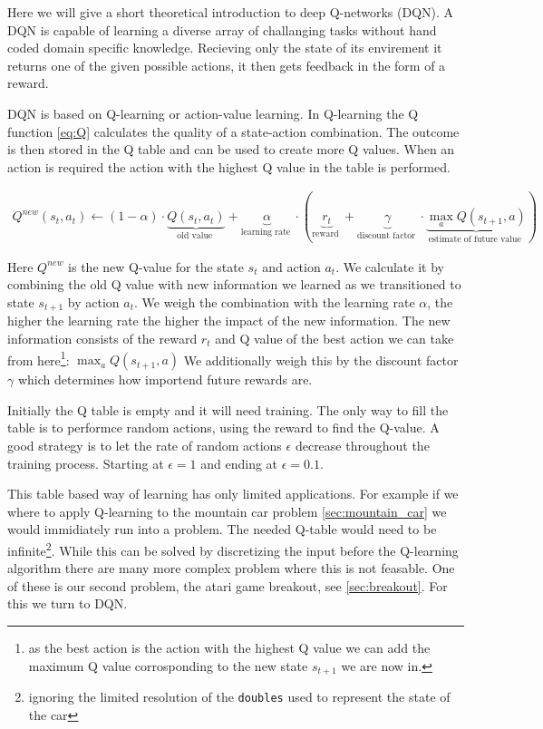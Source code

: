 \label{sec:theory}
Here we will give a short theoretical introduction to deep Q-networks (DQN). A DQN is capable of learning a diverse array of challanging tasks without hand coded domain specific knowledge. Recieving only the state of its envirement it returns one of the given possible actions, it then gets feedback in the form of a reward.

DQN is based on Q-learning or action-value learning. In Q-learning the Q function \autoref{eq:Q} calculates the quality of a state-action combination. The outcome is then stored in the Q table and can be used to create more Q values. When an action is required the action with the highest Q value in the table is performed.

\begin{align} \label{eq:Q}
Q^{n e w}\left(s_{t}, a_{t}\right) \leftarrow 
(1-\alpha)\cdot\underbrace{Q\left(s_{t}, a_{t}\right)}_{\text {old value }} 
%
+\underbrace{\alpha}_{\text {learning rate }} \cdot (\underbrace{r_{t}}_{\text {reward }}
+\underbrace{\gamma}_{\text {discount factor }} \cdot \underbrace{\max _{a} Q\left(s_{t+1}, a\right)}_{\text {estimate of future value }})
\end{align}

Here $Q^{new}$ is the new Q-value for the state $s_t$ and action $a_t$. We calculate it by combining the old Q value with new information we learned as we transitioned to state $s_{t+1}$ by action $a_t$. We weigh the combination with the learning rate $\alpha$, the higher the learning rate the higher the impact of the new information. The new information consists of the reward $r_t$ and Q value of the best action we can take from here\footnote{as the best action is the action with the highest Q value we can add the maximum Q value corrosponding to the new state $s_{t+1}$ we are now in.}: $\max _{a} Q\left(s_{t+1}, a\right)$ We additionally weigh this by the discount factor $\gamma$ which determines how importend future rewards are. 

Initially the Q table is empty and it will need training. The only way to fill the table is to performce random actions, using the reward to find the Q-value. A good strategy is to let the rate of random actions $\epsilon$ decrease throughout the training process. Starting at $\epsilon = 1$ and ending at $\epsilon = 0.1$.

This table based way of learning has only limited applications. For example if we where to apply Q-learning to the mountain car problem \autoref{sec:mountain_car} we would immidiately run into a problem. The needed Q-table would need to be infinite\footnote{ignoring the limited resolution of the \texttt{doubles} used to represent the state of the car}. While this can be solved by discretizing the input before the Q-learning algorithm there are many more complex problem where this is not feasable. One of these is our second problem, the atari game breakout, see \autoref{sec:breakout}. For this we turn to DQN.

